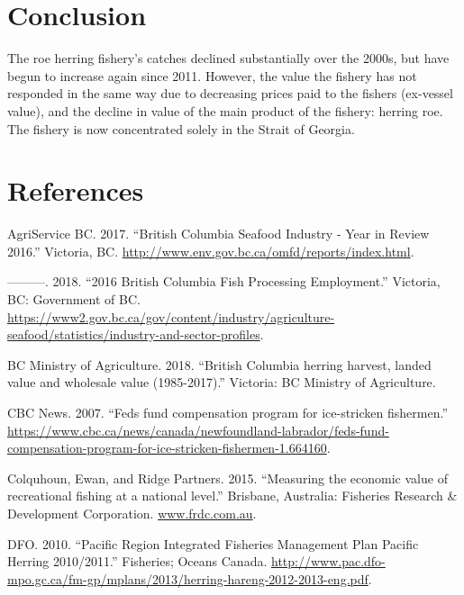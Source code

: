 \documentclass[]{article}
\theoremstyle{definition}
\theoremstyle{definition}
\theoremstyle{definition}
\theoremstyle{remark}
\begin{document}
\section{Conclusion}\label{conclusion}

The roe herring fishery's catches declined substantially over the 2000s,
but have begun to increase again since 2011. However, the value the
fishery has not responded in the same way due to decreasing prices paid
to the fishers (ex-vessel value), and the decline in value of the main
product of the fishery: herring roe. The fishery is now concentrated
solely in the Strait of Georgia.

\section*{References}\label{references}

\hypertarget{refs}{}
\hypertarget{ref-AgriServiceBC2017}{}
AgriService BC. 2017. ``British Columbia Seafood Industry - Year in
Review 2016.'' Victoria, BC.
\url{http://www.env.gov.bc.ca/omfd/reports/index.html}.

\hypertarget{ref-AgriServiceBC2018}{}
---------. 2018. ``2016 British Columbia Fish Processing Employment.''
Victoria, BC: Government of BC.
\href{https://www2.gov.bc.ca/gov/content/industry/agriculture-\%20seafood/statistics/industry-and-sector-profiles}{https://www2.gov.bc.ca/gov/content/industry/agriculture- seafood/statistics/industry-and-sector-profiles}.

\hypertarget{ref-BCMinistryofAgriculture2018}{}
BC Ministry of Agriculture. 2018. ``British Columbia herring harvest,
landed value and wholesale value (1985-2017).'' Victoria: BC Ministry of
Agriculture.

\hypertarget{ref-CBCNews2007}{}
CBC News. 2007. ``Feds fund compensation program for ice-stricken
fishermen.''
\url{https://www.cbc.ca/news/canada/newfoundland-labrador/feds-fund-compensation-program-for-ice-stricken-fishermen-1.664160}.

\hypertarget{ref-Colquhoun2015}{}
Colquhoun, Ewan, and Ridge Partners. 2015. ``Measuring the economic
value of recreational fishing at a national level.'' Brisbane,
Australia: Fisheries Research \& Development Corporation.
\url{www.frdc.com.au}.

\hypertarget{ref-DFO2015}{}
DFO. 2010. ``Pacific Region Integrated Fisheries Management Plan Pacific
Herring 2010/2011.'' Fisheries; Oceans Canada.
\url{http://www.pac.dfo-mpo.gc.ca/fm-gp/mplans/2013/herring-hareng-2012-2013-eng.pdf}.
\end{document}
